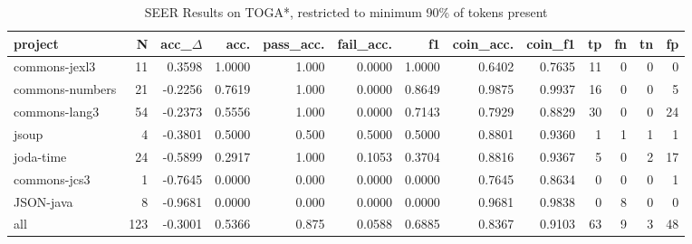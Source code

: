\begin{table*}
\centering
\caption{SEER Results on TOGA*, restricted to minimum 90\% of tokens present}
\label{tab:toga_results_10}
\begin{tabular}{lrrrrrrrrrrrr}
\toprule
         project &    N &  acc\_$\Delta$ &    acc. &  pass\_acc. &  fail\_acc. &      f1 &  coin\_acc. &  coin\_f1 &  tp &  fn &  tn &  fp \\
\midrule
   commons-jexl3 &   11 &      0.3598 &  1.0000 &      1.000 &     0.0000 &  1.0000 &     0.6402 &   0.7635 &  11 &   0 &   0 &   0 \\
 commons-numbers &   21 &     -0.2256 &  0.7619 &      1.000 &     0.0000 &  0.8649 &     0.9875 &   0.9937 &  16 &   0 &   0 &   5 \\
   commons-lang3 &   54 &     -0.2373 &  0.5556 &      1.000 &     0.0000 &  0.7143 &     0.7929 &   0.8829 &  30 &   0 &   0 &  24 \\
           jsoup &    4 &     -0.3801 &  0.5000 &      0.500 &     0.5000 &  0.5000 &     0.8801 &   0.9360 &   1 &   1 &   1 &   1 \\
       joda-time &   24 &     -0.5899 &  0.2917 &      1.000 &     0.1053 &  0.3704 &     0.8816 &   0.9367 &   5 &   0 &   2 &  17 \\
    commons-jcs3 &    1 &     -0.7645 &  0.0000 &      0.000 &     0.0000 &  0.0000 &     0.7645 &   0.8634 &   0 &   0 &   0 &   1 \\
       JSON-java &    8 &     -0.9681 &  0.0000 &      0.000 &     0.0000 &  0.0000 &     0.9681 &   0.9838 &   0 &   8 &   0 &   0 \\
             all &  123 &     -0.3001 &  0.5366 &      0.875 &     0.0588 &  0.6885 &     0.8367 &   0.9103 &  63 &   9 &   3 &  48 \\
\bottomrule
\end{tabular}
\end{table*}
